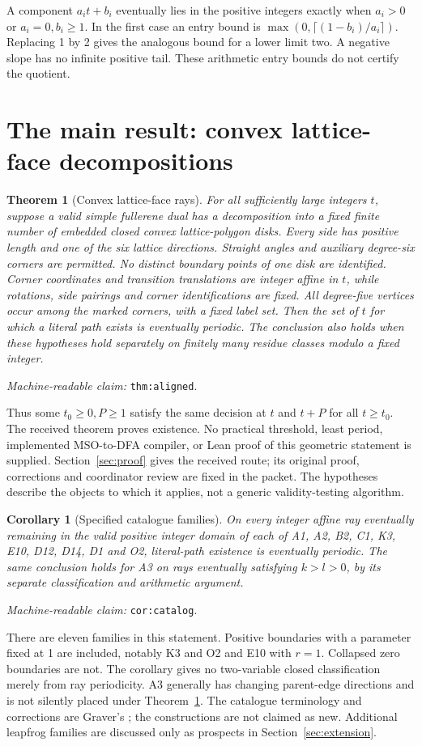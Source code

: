\documentclass[11pt]{amsart}
\newcommand{\record}[1]{\nolinkurl{#1}}
\newcommand{\claimid}[1]{\par\nopagebreak\noindent\textit{Machine-readable claim:} \record{#1}.\par}
\newtheorem{alignedtheorem}{Theorem}
\newtheorem{catalogcor}{Corollary}
\theoremstyle{definition}\newtheorem{definition}{Definition}
\begin{document}
A component $a_it+b_i$ eventually lies in the positive integers exactly
when $a_i>0$ or $a_i=0,b_i\ge1$. In the first case an entry bound is
$\max(0,\lceil(1-b_i)/a_i\rceil)$. Replacing 1 by 2 gives the analogous
bound for a lower limit two. A negative slope has no infinite positive
tail. These arithmetic entry bounds do not certify the quotient.

\section{The main result: convex lattice-face decompositions}\label{sec:main}
\begin{alignedtheorem}[Convex lattice-face rays]\label{thm:aligned}
For all sufficiently large integers $t$, suppose a valid simple
fullerene dual has a decomposition into a fixed finite number of
embedded closed convex lattice-polygon disks. Every side has positive
length and one of the six lattice directions. Straight angles and
auxiliary degree-six corners are permitted. No distinct boundary
points of one disk are identified. Corner coordinates and transition
translations are integer affine in $t$, while rotations, side pairings
and corner identifications are fixed. All degree-five vertices occur
among the marked corners, with a fixed label set. Then the set of
$t$ for which a literal path exists is eventually periodic.
The conclusion also holds when these hypotheses hold separately on
finitely many residue classes modulo a fixed integer.
\end{alignedtheorem}
\claimid{thm:aligned}
Thus some $t_0\ge0,P\ge1$ satisfy the same decision at $t$ and $t+P$
for all $t\ge t_0$. The received theorem proves existence. No practical
threshold, least period, implemented MSO-to-DFA compiler, or Lean proof
of this geometric statement is supplied. Section~\ref{sec:proof} gives
the received route; its original proof, corrections and coordinator
review are fixed in the packet. The hypotheses describe the objects
to which it applies, not a generic validity-testing algorithm.

\begin{catalogcor}[Specified catalogue families]\label{cor:catalog}
On every integer affine ray eventually remaining in the valid positive
integer domain of each of A1, A2, B2, C1, K3, E10, D12, D14, D1 and O2,
literal-path existence is eventually periodic. The same conclusion
holds for A3 on rays eventually satisfying $k>l>0$, by its separate
classification and arithmetic argument.
\end{catalogcor}
\claimid{cor:catalog}
There are eleven families in this statement. Positive boundaries with
a parameter fixed at 1 are included, notably K3 and O2 and E10 with
$r=1$. Collapsed zero boundaries are not. The corollary gives no
two-variable closed classification merely from ray periodicity.
A3 generally has changing parent-edge directions and is not silently
placed under Theorem~\ref{thm:aligned}. The catalogue terminology and
corrections are Graver's \cite{Graver}; the constructions are not claimed
as new. Additional leapfrog families are discussed only as prospects
in Section~\ref{sec:extension}.
\end{document}
